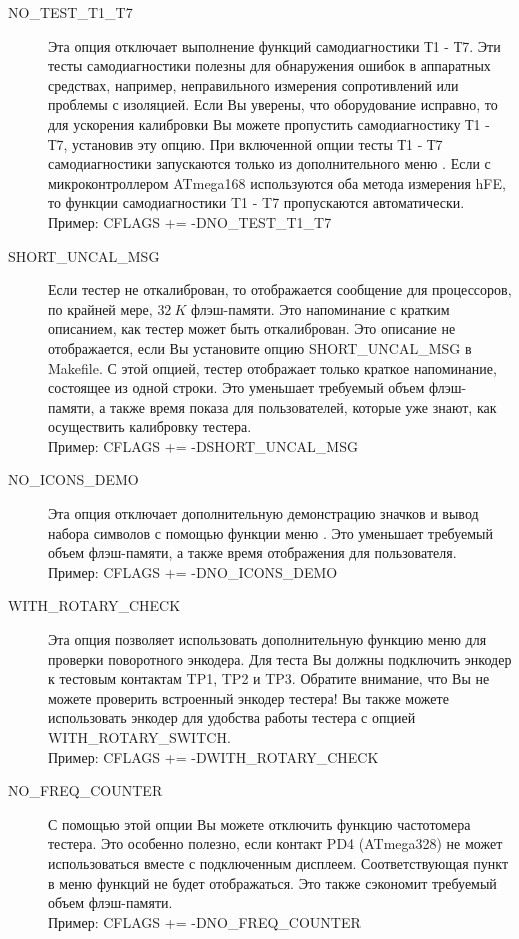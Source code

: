 \begin{description}
  \item[NO\_TEST\_T1\_T7] Эта опция отключает выполнение функций самодиагностики Т1 - Т7.
Эти тесты самодиагностики полезны для обнаружения ошибок в аппаратных средствах, например, неправильного измерения 
сопротивлений или проблемы с изоляцией. Если Вы уверены, что оборудование исправно, то для ускорения калибровки 
Вы можете пропустить самодиагностику Т1 - Т7, установив эту опцию. 
При включенной опции тесты Т1 - Т7 самодиагностики запускаются только из дополнительного меню . 
Если с микроконтроллером ATmega168 используются оба метода измерения hFE, то функции самодиагностики T1 - T7 
пропускаются автоматически.\\
Пример: CFLAGS += -DNO\_TEST\_T1\_T7

  \item[SHORT\_UNCAL\_MSG] Если тестер не откалиброван, то отображается сообщение для процессоров, по крайней
мере, \(32~K\) флэш-памяти. Это напоминание с кратким описанием, как тестер может быть откалиброван.
Это описание не отображается, если Вы установите опцию SHORT\_UNCAL\_MSG в Makefile.
С этой опцией, тестер отображает только краткое напоминание, состоящее из одной строки.
Это уменьшает требуемый объем флэш-памяти, а также время показа для пользователей, которые уже знают, как
осуществить калибровку тестера.\\
Пример: CFLAGS += -DSHORT\_UNCAL\_MSG

  \item[NO\_ICONS\_DEMO]
Эта опция отключает дополнительную демонстрацию значков и вывод набора символов с помощью функции меню 
.
Это уменьшает требуемый объем флэш-памяти, а также время отображения для пользователя.\\
Пример: CFLAGS += -DNO\_ICONS\_DEMO

  \item[WITH\_ROTARY\_CHECK]
Эта опция позволяет использовать дополнительную функцию меню для проверки поворотного энкодера.
Для теста Вы должны подключить энкодер к тестовым контактам TP1, TP2 и TP3.
Обратите внимание, что Вы не можете проверить встроенный энкодер тестера!
Вы также можете использовать энкодер для удобства работы тестера с опцией WITH\_ROTARY\_SWITCH.\\
Пример: CFLAGS += -DWITH\_ROTARY\_CHECK

  \item[NO\_FREQ\_COUNTER]
С помощью этой опции Вы можете отключить функцию частотомера тестера.
Это особенно полезно, если контакт PD4 (ATmega328) не может использоваться вместе с подключенным дисплеем.
Соответствующая пункт в меню функций не будет отображаться. Это также сэкономит требуемый объем флэш-памяти.\\
Пример: CFLAGS += -DNO\_FREQ\_COUNTER


\end{description}

